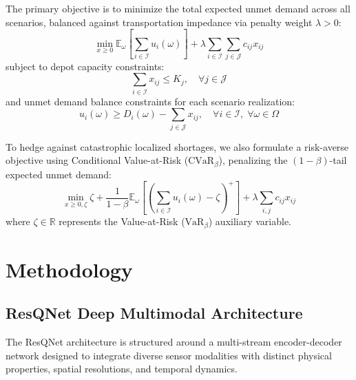 \documentclass[journal]{IEEEtran}
\begin{document}
The primary objective is to minimize the total expected unmet demand across all scenarios, balanced against transportation impedance via penalty weight $\lambda > 0$:
\begin{equation}
\label{eq:allocation_obj}
\min_{x \ge 0} \mathbb{E}_{\omega}\left[\sum_{i \in \mathcal{I}} u_i(\omega)\right] + \lambda \sum_{i \in \mathcal{I}} \sum_{j \in \mathcal{J}} c_{ij} x_{ij}
\end{equation}
subject to depot capacity constraints:
\begin{equation}
\label{eq:cap_constraint}
\sum_{i \in \mathcal{I}} x_{ij} \le K_j, \quad \forall j \in \mathcal{J}
\end{equation}
and unmet demand balance constraints for each scenario realization:
\begin{equation}
\label{eq:unmet_constraint}
u_i(\omega) \ge D_i(\omega) - \sum_{j \in \mathcal{J}} x_{ij}, \quad \forall i \in \mathcal{I}, \; \forall \omega \in \Omega
\end{equation}

To hedge against catastrophic localized shortages, we also formulate a risk-averse objective using Conditional Value-at-Risk ($\text{CVaR}_\beta$), penalizing the $(1-\beta)$-tail expected unmet demand:
\begin{equation}
\label{eq:cvar_obj}
\min_{x \ge 0, \zeta} \zeta + \frac{1}{1-\beta} \mathbb{E}_\omega\left[\left(\sum_{i \in \mathcal{I}} u_i(\omega) - \zeta\right)^+\right] + \lambda \sum_{i,j} c_{ij} x_{ij}
\end{equation}
where $\zeta \in \mathbb{R}$ represents the Value-at-Risk ($\text{VaR}_\beta$) auxiliary variable.

\section{Methodology}
\label{sec:method}

\subsection{ResQNet Deep Multimodal Architecture}
The ResQNet architecture is structured around a multi-stream encoder-decoder network designed to integrate diverse sensor modalities with distinct physical properties, spatial resolutions, and temporal dynamics.
\end{document}
